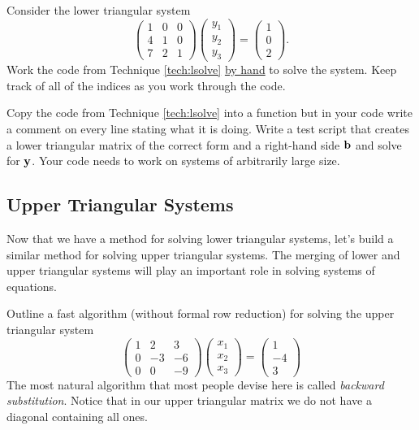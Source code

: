 \begin{problem}
    Consider the lower triangular system 
    \[ \begin{pmatrix} 1 & 0 & 0 \\ 4 & 1 & 0 \\ 7 & 2 & 1 \end{pmatrix} \begin{pmatrix}
        y_1 \\ y_2 \\ y_3 \end{pmatrix} = \begin{pmatrix} 1 \\ 0 \\ 2\end{pmatrix}. \]
    Work the code from Technique \ref{tech:lsolve} \underline{by hand} to solve the
    system.  Keep track of all of the indices as you work through the code.
\end{problem}

\begin{problem}
    Copy the code from Technique \ref{tech:lsolve} into a \ProgLang function but in your code
    write a comment on every line stating what it is doing.  Write a test script that
    creates a lower triangular matrix of the correct form and a right-hand side ${\bf b}$ and
    solve for ${\bf y}$.  Your code needs to work on systems of arbitrarily large size.
\end{problem}


\subsection{Upper Triangular Systems}
Now that we have a method for solving lower triangular systems, let's build a similar
method for solving upper triangular systems.  The merging of lower and upper triangular
systems will play an important role in solving systems of equations.
\begin{problem}
    Outline a fast algorithm (without formal row reduction) for solving the upper triangular system
    \[ \begin{pmatrix} 1 & 2 & 3 \\ 0 & -3 & -6 \\ 0 & 0 & -9 \end{pmatrix}
        \begin{pmatrix} x_1 \\ x_2 \\ x_3 \end{pmatrix} = \begin{pmatrix} 1 \\ -4 \\
        3\end{pmatrix} \]
    The most natural algorithm that most people devise here is called {\it backward
    substitution}.  Notice that in our upper triangular matrix we do not have a diagonal
    containing all ones. 
\end{problem}

